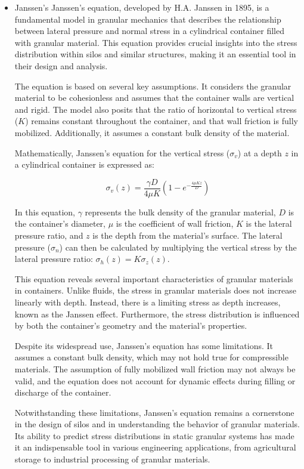 \documentclass[xcolor=dvipsnames,10pt,hidelinks]{article}
\begin{document}
\begin{itemize}
\begin{itemize}
\item Janssen's
Janssen's equation, developed by H.A. Janssen in 1895, is a fundamental model in granular mechanics that describes the relationship between lateral pressure and normal stress in a cylindrical container filled with granular material. This equation provides crucial insights into the stress distribution within silos and similar structures, making it an essential tool in their design and analysis.

The equation is based on several key assumptions. It considers the granular material to be cohesionless and assumes that the container walls are vertical and rigid. The model also posits that the ratio of horizontal to vertical stress (\(K\)) remains constant throughout the container, and that wall friction is fully mobilized. Additionally, it assumes a constant bulk density of the material.

Mathematically, Janssen's equation for the vertical stress (\(\sigma_v\)) at a depth \(z\) in a cylindrical container is expressed as:

$$ \sigma_v(z) = \frac{\gamma D}{4\mu K} \left(1 - e^{-\frac{4\mu K z}{D}}\right) $$

In this equation, \(\gamma\) represents the bulk density of the granular material, \(D\) is the container's diameter, \(\mu\) is the coefficient of wall friction, \(K\) is the lateral pressure ratio, and \(z\) is the depth from the material's surface. The lateral pressure (\(\sigma_n\)) can then be calculated by multiplying the vertical stress by the lateral pressure ratio: \(\sigma_h (z) = K \sigma_z (z)\).

This equation reveals several important characteristics of granular materials in containers. Unlike fluids, the stress in granular materials does not increase linearly with depth. Instead, there is a limiting stress as depth increases, known as the Janssen effect. Furthermore, the stress distribution is influenced by both the container's geometry and the material's properties.

Despite its widespread use, Janssen's equation has some limitations. It assumes a constant bulk density, which may not hold true for compressible materials. The assumption of fully mobilized wall friction may not always be valid, and the equation does not account for dynamic effects during filling or discharge of the container.

Notwithstanding these limitations, Janssen's equation remains a cornerstone in the design of silos and in understanding the behavior of granular materials. Its ability to predict stress distributions in static granular systems has made it an indispensable tool in various engineering applications, from agricultural storage to industrial processing of granular materials.


\end{itemize}
\end{itemize}
\end{document}
